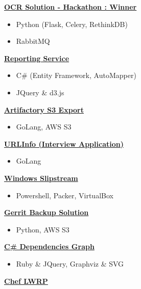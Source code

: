 {\textbf{\href{http://johnpaulnewman.com/projects/papers-ocr-solution/}{OCR Solution - Hackathon : Winner}}
\begin{itemize}[noitemsep,topsep=-10pt]
  \item Python (Flask, Celery, RethinkDB)
  \item RabbitMQ \\
\end{itemize}
\textbf{\href{http://johnpaulnewman.com/projects/reporting-service/}{Reporting Service}}
\begin{itemize}[noitemsep,topsep=-10pt]
  \item C\# (Entity Framework, AutoMapper)
  \item JQuery \& d3.js \\
\end{itemize}
\textbf{\href{https://github.com/jpnewman/artifactory-s3-export}{Artifactory S3 Export}}
\begin{itemize}[noitemsep,topsep=-10pt]
  \item GoLang, AWS S3 \\
\end{itemize}
\textbf{\href{https://github.com/jpnewman/urlinfo}{URLInfo (Interview Application)}}
\begin{itemize}[noitemsep,topsep=-10pt]
  \item GoLang \\
\end{itemize}
\textbf{\href{https://github.com/jpnewman/Windows-Slipstream}{Windows Slipstream}}
\begin{itemize}[noitemsep,topsep=-10pt]
  \item Powershell, Packer, VirtualBox \\
\end{itemize}
\textbf{\href{http://johnpaulnewman.com/projects/gerrit-backup-solution/}{Gerrit Backup Solution}}
\begin{itemize}[noitemsep,topsep=-10pt]
  \item Python, AWS S3 \\
\end{itemize}
\textbf{\href{http://johnpaulnewman.com/projects/csharp-dependencies-graph/}{C\# Dependencies Graph}}
\begin{itemize}[noitemsep,topsep=-10pt]
  \item Ruby \& JQuery, Graphviz \& SVG \\
\end{itemize}
\textbf{\href{http://johnpaulnewman.com/projects/chef-lwrp/}{Chef LWRP}}
\begin{itemize}[noitemsep,topsep=-10pt]

\end{itemize}}
